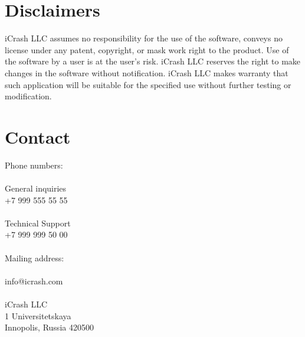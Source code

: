 \section{Disclaimers}

iCrash LLC assumes no responsibility for the use of the software, conveys no
license under any patent, copyright, or mask work right to the product.
Use of the software by a user is at the user's risk.
iCrash LLC reserves the right to make changes in the software without notification.
iCrash LLC makes warranty that such application will be suitable for the specified use without further testing or modification.

\section{Contact}
Phone numbers:\\
\\
General inquiries\\
+7 999 555 55 55\\
\\
Technical Support\\
+7 999 999 50 00\\
\\
Mailing address:\\
\\
info@icrash.com\\
\\
iCrash LLC\\
1 Universitetskaya\\
Innopolis, Russia 420500